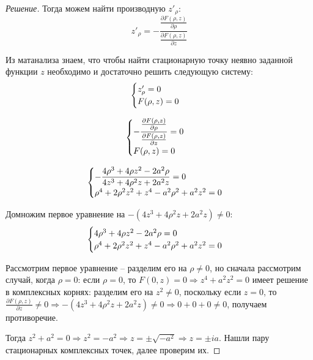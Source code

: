 \documentclass{article}
\begin{document}
\begin{proof}[Решение]
		Тогда можем найти производную $z'_\rho$:
		$$z'_\rho = -\dfrac{\frac{\partial F(\rho, z)}{\partial \rho} }{\frac{\partial F(\rho, z)}{\partial z}}$$
		
		Из матанализа знаем, что чтобы найти стационарную точку неявно заданной функции $z$ необходимо и достаточно решить следующую систему:
		\begin{equation*}
			\begin{cases}
				$$z'_\rho = 0$$ \\
				$$F(\rho, z) = 0$$
			\end{cases}
		\end{equation*}
	
	\begin{equation*}
		\begin{cases}
			$$-\dfrac{\frac{\partial F(\rho, z)}{\partial \rho} }{\frac{\partial F(\rho, z)}{\partial z}} = 0$$ \\
			$$F(\rho, z) = 0$$
		\end{cases}
	\end{equation*}
	
	\begin{equation*}
		\begin{cases}
			$$-\dfrac{4\rho^3 + 4\rho z^2 -2a^2\rho}{4z^3 + 4\rho^2 z +2a^2z} = 0$$ \\
			$$\rho^4 + 2\rho^2z^2 + z^4 - a^2\rho^2 + a^2z^2 = 0$$
		\end{cases}
	\end{equation*}

	Домножим первое уравнение на $-(4z^3 + 4\rho^2 z +2a^2z) \not = 0$:
	\begin{equation*}
		\begin{cases}
			$$4\rho^3 + 4\rho z^2 -2a^2\rho = 0$$ \\
			$$\rho^4 + 2\rho^2z^2 + z^4 - a^2\rho^2 + a^2z^2 = 0$$
		\end{cases}
	\end{equation*}
	
	Рассмотрим первое уравнение -- разделим его на $\rho \not = 0$, но сначала рассмотрим случай, когда $\rho=0$: если $\rho = 0$, то $F(0, z) = 0 \Rightarrow z^4 +a^2z^2 = 0$ имеет решение в комплексных корнях: разделим его на $z^2 \not = 0$, поскольку если $z=0$, то 
	$\frac{\partial F(\rho, z)}{\partial z} \not = 0 \Rightarrow -(4z^3 + 4\rho^2 z +2a^2z) \not = 0 \Rightarrow 0 + 0 + 0 \not = 0$, получаем противоречие.
	
	Тогда $z^2 + a^2 = 0 \Rightarrow z^2 = -a^2 \Rightarrow z = \pm \sqrt{-a^2} 
	\Rightarrow z = \pm ia$. Нашли пару стационарных комплексных точек, далее проверим их.
	

\end{proof}
\end{document}
